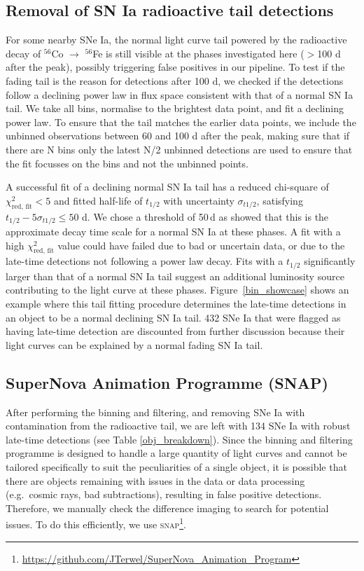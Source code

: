 \documentclass[a4paper,oneside,12pt, class=Latex/Classes/PhDthesisPSnPDF, crop=false]{standalone}
\begin{document}
\subsection{Removal of SN Ia radioactive tail detections}
\label{tail_removal} 
For some nearby SNe Ia, the normal light curve tail powered by the radioactive decay of $^{56}$Co $\rightarrow$ $^{56}$Fe is still visible at the phases investigated here ($>$100 d after the peak), possibly triggering false positives in our pipeline. To test if the fading tail is the reason for detections after 100 d, we checked if the detections follow a declining power law in flux space consistent with that of a normal SN Ia tail. We take all bins, normalise to the brightest data point, and fit a declining power law. To ensure that the tail matches the earlier data points, we include the unbinned observations between 60 and 100 d after the peak, making sure that if there are N bins only the latest N/2 unbinned detections are used to ensure that the fit focusses on the bins and not the unbinned points.

A successful fit of a declining normal SN Ia tail has a reduced chi-square of $\chi^2_\text{red, fit} < 5$ and fitted half-life of $t_{1/2}$ with uncertainty $\sigma_{t1/2}$, satisfying $t_{1/2} - 5\sigma_{t1/2} \leq 50$ d. We chose a threshold of 50\,d as \citealt{Georgios_11fe} showed that this is the approximate decay time scale for a normal SN Ia at these phases. A fit with a high $\chi^2_\text{red, fit}$ value could have failed due to bad or uncertain data, or due to the late-time detections not following a power law decay. Fits with a $t_{1/2}$ significantly larger than that of a normal SN Ia tail suggest an additional luminosity source contributing to the light curve at these phases. Figure~\ref{bin_showcase} shows an example where this tail fitting procedure determines the late-time detections in an object to be a normal declining SN Ia tail. 432 SNe Ia that were flagged as having late-time detection are discounted from further discussion because their light curves can be explained by a normal fading SN Ia tail. 


\subsection{SuperNova Animation Programme (SNAP)}
\label{snap}
 After performing the binning and filtering, and removing SNe Ia with contamination from the radioactive tail, we are left with 134 SNe Ia with robust late-time detections (see Table \ref{obj_breakdown}). Since the binning and filtering programme is designed to handle a large quantity of light curves and cannot be tailored specifically to suit the peculiarities of a single object, it is possible that there are objects remaining with issues in the data or data processing (e.g.~cosmic rays, bad subtractions), resulting in false positive detections. Therefore, we manually check the difference imaging to search for potential issues. To do this efficiently, we use \textsc{snap}\footnote{\url{https://github.com/JTerwel/SuperNova_Animation_Program}}.
\end{document}
